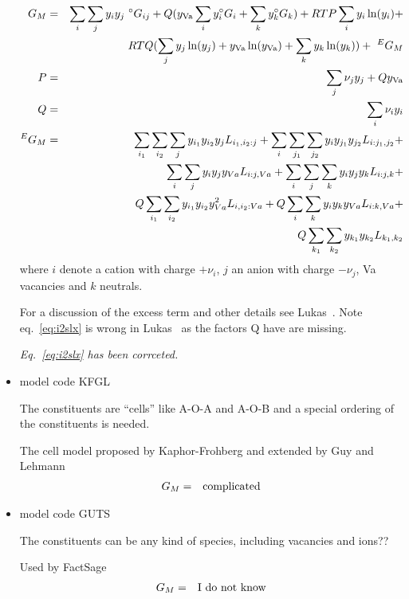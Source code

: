 \documentclass[12pt]{article}
\begin{document}
\begin{itemize}
  \begin{eqnarray}
    G_M &=& \sum_i \sum_j y_iy_j~^{\circ}G_{ij} + Q(y_{\rm Va}\sum_i y_i^{\circ}G_i + 
    \sum_k y_k ^{\circ}G_k) + RT P\sum_i y_i\ln(y_i)+\nonumber\\&&
    RTQ(\sum_j y_j\ln(y_j)+y_{\rm Va}\ln(y_{\rm Va}) + \sum_k y_k\ln(y_k))+ ~^EG_M\\
    P &=& \sum_j \nu_jy_j + Qy_{\rm Va}\\
    Q &=& \sum_i \nu_iy_i\\
    ^EG_M &=& \sum_{i_1}\sum_{i_2}\sum_j y_{i_1}y_{i_2}y_j L_{i_1,i_2:j}+\sum_i\sum_{j_1}\sum_{j_2}y_iy_{j_1}y_{j_2}L_{i:j_1,j_2}+\nonumber\\&&
    \sum_i\sum_jy_iy_jy_{Va}L_{i:j,Va}+\sum_i\sum_j\sum_ky_iy_jy_kL_{i:j,k}+\nonumber\\&&
    Q\sum_{i_1}\sum_{i_2} y_{i_1}y_{i_2}y_{Va}^2 L_{i,i_2:Va}+Q\sum_i\sum_ky_iy_ky_{Va}L_{i:k,Va}+\nonumber\\&&
    Q\sum_{k_1}\sum_{k_2}y_{k_1}y_{k_2}L_{k_1,k_2}\label{eq:i2slx}
  \end{eqnarray}
  where $i$ denote a cation with charge $+\nu_i$, $j$ an anion with
  charge $-\nu_j$, Va vacancies and $k$ neutrals.
  
  For a discussion of the excess term and other details see
  Lukas~\cite{07Luk}.  Note eq.~\ref{eq:i2slx} is wrong in
  Lukas~\cite{07Luk} as the factors Q have are missing.

  {\em Eq.~\ref{eq:i2slx} has been corrceted.}

\item model code KFGL

  The constituents are ``cells'' like A-O-A and A-O-B and a special
  ordering of the constituents is needed.

  The cell model proposed by Kaphor-Frohberg and extended by Guy and Lehmann
  \begin{eqnarray}
    G_M &=& {\rm complicated}
  \end{eqnarray}

\item model code GUTS

  The constituents can be any kind of species, including vacancies and
  ions??

  Used by FactSage
  \begin{eqnarray}
    G_M &=& {\rm I~do~not~know}
  \end{eqnarray}


\end{itemize}
\end{document}
